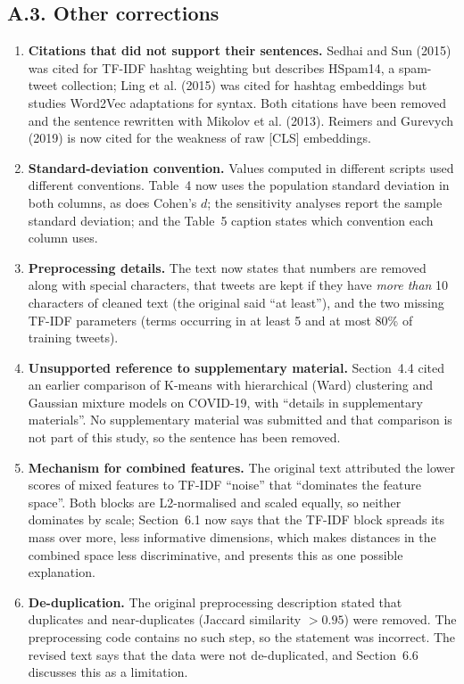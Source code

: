 \documentclass[11pt,a4paper]{article}
\begin{document}
\subsection{A.3. Other corrections}

\begin{enumerate}
\item \textbf{Citations that did not support their sentences.} Sedhai and Sun (2015) was cited for TF-IDF hashtag weighting but describes HSpam14, a spam-tweet collection; Ling et al. (2015) was cited for hashtag embeddings but studies Word2Vec adaptations for syntax. Both citations have been removed and the sentence rewritten with Mikolov et al. (2013). Reimers and Gurevych (2019) is now cited for the weakness of raw [CLS] embeddings.
\item \textbf{Standard-deviation convention.} Values computed in different scripts used different conventions. Table~4 now uses the population standard deviation in both columns, as does Cohen's $d$; the sensitivity analyses report the sample standard deviation; and the Table~5 caption states which convention each column uses.
\item \textbf{Preprocessing details.} The text now states that numbers are removed along with special characters, that tweets are kept if they have \emph{more than} 10 characters of cleaned text (the original said ``at least''), and the two missing TF-IDF parameters (terms occurring in at least 5 and at most 80\% of training tweets).
\item \textbf{Unsupported reference to supplementary material.} Section~4.4 cited an earlier comparison of K-means with hierarchical (Ward) clustering and Gaussian mixture models on COVID-19, with ``details in supplementary materials''. No supplementary material was submitted and that comparison is not part of this study, so the sentence has been removed.
\item \textbf{Mechanism for combined features.} The original text attributed the lower scores of mixed features to TF-IDF ``noise'' that ``dominates the feature space''. Both blocks are L2-normalised and scaled equally, so neither dominates by scale; Section~6.1 now says that the TF-IDF block spreads its mass over more, less informative dimensions, which makes distances in the combined space less discriminative, and presents this as one possible explanation.
\item \textbf{De-duplication.} The original preprocessing description stated that duplicates and near-duplicates (Jaccard similarity $> 0.95$) were removed. The preprocessing code contains no such step, so the statement was incorrect. The revised text says that the data were not de-duplicated, and Section~6.6 discusses this as a limitation.

\end{enumerate}
\end{document}
